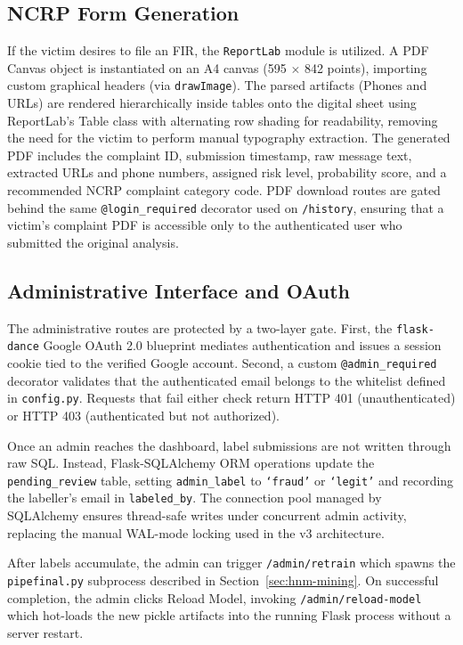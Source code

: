 \subsection{NCRP Form Generation}
If the victim desires to file an FIR, the \texttt{ReportLab} module is utilized. A PDF Canvas object is instantiated on an A4 canvas (595 $\times$ 842 points), importing custom graphical headers (via \texttt{drawImage}). The parsed artifacts (Phones and URLs) are rendered hierarchically inside tables onto the digital sheet using ReportLab's Table class with alternating row shading for readability, removing the need for the victim to perform manual typography extraction. The generated PDF includes the complaint ID, submission timestamp, raw message text, extracted URLs and phone numbers, assigned risk level, probability score, and a recommended NCRP complaint category code. PDF download routes are gated behind the same \texttt{@login\_required} decorator used on \texttt{/history}, ensuring that a victim's complaint PDF is accessible only to the authenticated user who submitted the original analysis.

\subsection{Administrative Interface and OAuth}

The administrative routes are protected by a two-layer gate. First, the
\texttt{flask-dance} Google OAuth 2.0 \cite{hardt2012oauth} blueprint mediates authentication and
issues a session cookie tied to the verified Google account. Second, a
custom \texttt{@admin\_required} decorator validates that the authenticated
email belongs to the whitelist defined in \texttt{config.py}. Requests that
fail either check return HTTP 401 (unauthenticated) or HTTP 403
(authenticated but not authorized).

Once an admin reaches the dashboard, label submissions are not written
through raw SQL. Instead, Flask-SQLAlchemy ORM operations update the
\texttt{pending\_review} table, setting \texttt{admin\_label} to
\texttt{`fraud'} or \texttt{`legit'} and recording the labeller's email in
\texttt{labeled\_by}. The connection pool managed by SQLAlchemy ensures
thread-safe writes under concurrent admin activity, replacing the manual
WAL-mode locking used in the v3 architecture.

After labels accumulate, the admin can trigger \texttt{/admin/retrain}
which spawns the \texttt{pipefinal.py} subprocess described in
Section~\ref{sec:hnm-mining}. On successful completion, the admin
clicks Reload Model, invoking \texttt{/admin/reload-model} which
hot-loads the new pickle artifacts into the running Flask process
without a server restart.

